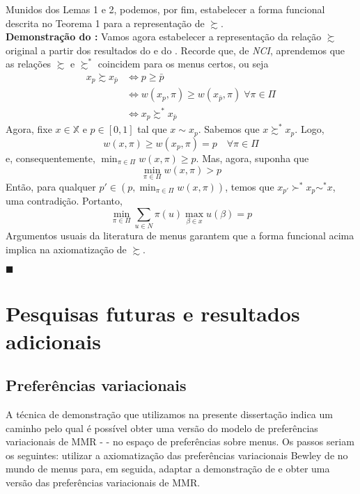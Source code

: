\documentclass[11pt, a4paper]{article}
\theoremstyle{nonumberplain}
\theoremstyle{plain}
\theoremstyle{plain}
\theoremstyle{plain}
\theoremstyle{nonumberplain}
\begin{document}
Munidos dos Lemas 1 e 2, podemos, por fim, estabelecer a forma funcional descrita no Teorema 1 para a representação de $\succsim$. \\
\noindent
\textbf{Demonstração do :} Vamos agora estabelecer a representação da relação $\succsim$ original a partir dos resultados do  e do . Recorde que, de \emph{NCI}, aprendemos que as relações $\succsim$ e $\succsim^*$ coincidem para os menus certos, ou seja
\begin{align*}
x_p\succsim x_{\bar{p}}&\Leftrightarrow p\geq \bar{p}\\
&\Leftrightarrow w(x_p,\pi)\geq w(x_{\bar{p}},\pi)\; \forall\pi\in\Pi \\
&\Leftrightarrow x_p\succsim^* x_{\bar{p}}
\end{align*}
Agora, fixe $x\in \mathbb{X}$ e $p\in[0,1]$ tal que $x\sim x_p$. Sabemos que $x\succsim^* x_p$. Logo, $$w(x,\pi)\geq w(x_p,\pi)=p\quad\forall\pi \in \Pi$$ e, consequentemente, $\min_{\pi\in\Pi}w(x,\pi)\geq p$. Mas, agora, suponha que $$\min_{\pi\in\Pi}w(x,\pi)> p$$ Então, para qualquer $p'\in (p,\min_{\pi\in\Pi}w(x,\pi))$, temos que $x_{p'}\succ^* x_p\sim^* x$, uma contradição. Portanto, $$\min_{\pi\in\Pi}\sum_{u\in N} \pi(u)\max_{\beta\in x}u(\beta)=p$$
Argumentos usuais da literatura de menus garantem que a forma funcional acima implica na axiomatização de $\succsim$.
\begin{flushright}
$\blacksquare$
\end{flushright}
\section{Pesquisas futuras e resultados adicionais}

\subsection{Preferências variacionais}
A técnica de demonstração que utilizamos na presente dissertação indica um caminho pelo qual é possível obter uma versão do modelo de preferências variacionais de MMR - \cite{Maccheroni2006} - no espaço de preferências sobre menus. Os passos seriam os seguintes: utilizar a axiomatização das preferências variacionais Bewley de \cite{Faro2015} no mundo de menus para, em seguida, adaptar a demonstração de \cite{Brotherhood2014} e obter uma versão das preferências variacionais de MMR.
\end{document}
